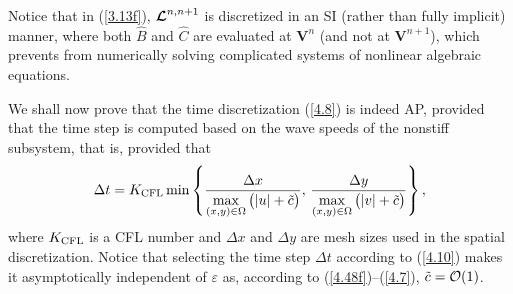 \documentclass[preprint,12pt]{elsarticle}
\newcommand{\dt}{\Delta t}
\newcommand{\dx}{\Delta x}
\newcommand{\dy}{\Delta y}
\newcommand{\ve}{\varepsilon}
\newcommand\eref[1]{(\ref{#1})}
\begin{document}
Notice that in \eref{3.13f}, $\bm{{\cal L}}^{n,n+1}$ is discretized in an SI (rather than fully implicit) manner, where both $\widehat B$
and $\widehat C$ are evaluated at $\bm V^n$ (and not at $\bm V^{n+1}$), which prevents from numerically solving complicated systems of
nonlinear algebraic equations.

We shall now prove that the time discretization \eref{4.8} is indeed AP, provided that the time step is computed based on the wave speeds 
of the nonstiff subsystem, that is, provided that
\begin{equation}
	\dt=K_{\rm CFL}\min\left\{\frac{\dx}{\max\limits_{(x,y)\in\Omega}\big(|u|+\tilde c\big)},\,
	\frac{\dy}{\max\limits_{(x,y)\in\Omega}\big(|v|+\tilde c\big)}\right\},
	\label{4.10}
\end{equation}
where $K_{\rm CFL}$ is a CFL number and $\dx$ and $\dy$ are mesh sizes used in the spatial discretization. Notice that selecting the time
step $\dt$ according to \eref{4.10} makes it asymptotically independent of $\ve$ as, according to \eref{4.48f}--\eref{4.7},
$\tilde c={\cal O}(1)$.
\end{document}
